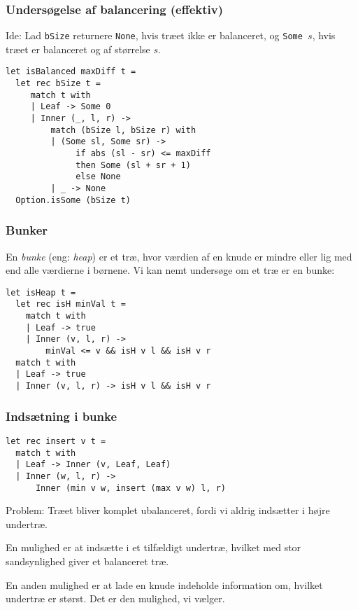 \documentclass{beamer}
\begin{document}
\begin{frame}[fragile=singleslide]
\frametitle{Undersøgelse af balancering (effektiv)}

Ide: Lad \texttt{bSize} returnere \texttt{None}, hvis træet ikke er
balanceret, og \texttt{Some $s$}, hvis træet er balanceret og af
størrelse $s$.

\renewcommand{\baselinestretch}{0.9}
\begin{verbatim}
let isBalanced maxDiff t =
  let rec bSize t =
     match t with
     | Leaf -> Some 0
     | Inner (_, l, r) ->
         match (bSize l, bSize r) with
         | (Some sl, Some sr) ->
              if abs (sl - sr) <= maxDiff
              then Some (sl + sr + 1)
              else None
         | _ -> None
  Option.isSome (bSize t)
\end{verbatim}

\end{frame}

\begin{frame}[fragile=singleslide]
\frametitle{Bunker}

En \emph{bunke} (eng: \emph{heap}) er et træ, hvor værdien af en knude
er mindre eller lig med end alle værdierne i børnene.  Vi kan
nemt undersøge om et træ er en bunke:

\renewcommand{\baselinestretch}{0.9}
\begin{verbatim}
let isHeap t =
  let rec isH minVal t =
    match t with
    | Leaf -> true
    | Inner (v, l, r) ->
        minVal <= v && isH v l && isH v r
  match t with
  | Leaf -> true
  | Inner (v, l, r) -> isH v l && isH v r
\end{verbatim}

\end{frame}

\begin{frame}[fragile=singleslide]
\frametitle{Indsætning i bunke}

\renewcommand{\baselinestretch}{0.9}
\begin{verbatim}
let rec insert v t =
  match t with
  | Leaf -> Inner (v, Leaf, Leaf)
  | Inner (w, l, r) ->
      Inner (min v w, insert (max v w) l, r)
\end{verbatim}

Problem: Træet bliver komplet ubalanceret, fordi vi aldrig indsætter i
højre undertræ.

En mulighed er at indsætte i et tilfældigt undertræ, hvilket med stor
sandsynlighed giver et balanceret træ.

En anden mulighed er at lade en knude indeholde information om,
hvilket undertræ er størst.  Det er den mulighed, vi vælger.

\end{frame}
\end{document}
